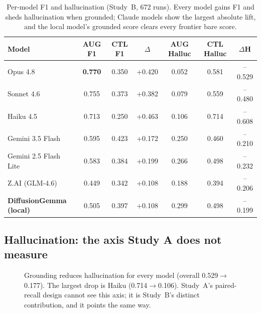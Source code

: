 \documentclass[11pt]{article}
\newcommand{\up}[1]{\textcolor{burnt}{+#1}}
\newcommand{\down}[1]{\textcolor{teal0}{--#1}}
\begin{document}
\begin{samepage}
\begin{table}[h]\centering\small
\begin{tabular}{lcccccc}
\toprule
Model & AUG F1 & CTL F1 & $\Delta$ & AUG Halluc & CTL Halluc & $\Delta$H \\
\midrule
Opus 4.8 & \textbf{0.770} & 0.350 & \up{0.420} & 0.052 & 0.581 & \down{0.529} \\
Sonnet 4.6 & 0.755 & 0.373 & \up{0.382} & 0.079 & 0.559 & \down{0.480} \\
Haiku 4.5 & 0.713 & 0.250 & \up{0.463} & 0.106 & 0.714 & \down{0.608} \\
Gemini 3.5 Flash & 0.595 & 0.423 & \up{0.172} & 0.250 & 0.460 & \down{0.210} \\
Gemini 2.5 Flash Lite & 0.583 & 0.384 & \up{0.199} & 0.266 & 0.498 & \down{0.232} \\
Z.AI (GLM-4.6) & 0.449 & 0.342 & \up{0.108} & 0.188 & 0.394 & \down{0.206} \\
\midrule
\textbf{DiffusionGemma (local)} & 0.505 & 0.397 & \up{0.108} & 0.299 & 0.498 & \down{0.199} \\
\bottomrule
\end{tabular}
\caption{Per-model F1 and hallucination (Study~B, 672 runs). Every model gains F1 and sheds
hallucination when grounded; Claude models show the largest absolute lift, and the local model's
grounded score clears every frontier bare score.}
\end{table}
\end{samepage}

\subsection{Hallucination: the axis Study A does not measure}
\begin{figure}[H]\centering
{}
\caption{Grounding reduces hallucination for every model (overall 0.529$\to$0.177). The largest
drop is Haiku (0.714$\to$0.106). Study~A's paired-recall design cannot see this axis; it is
Study~B's distinct contribution, and it points the same way.}
\end{figure}
\end{document}
